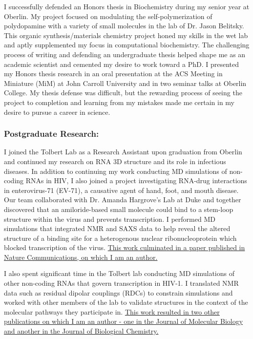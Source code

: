 \documentclass{NIHGrant}
\begin{document}
I successfully defended an Honors thesis in Biochemistry during my senior year at Oberlin. My project focused on modulating the self-polymerization of polydopamine with a variety of small molecules in the lab of Dr. Jason Belitsky. This organic synthesis/materials chemistry project honed my skills in the wet lab and aptly supplemented my focus in computational biochemistry. The challenging process of writing and defending an undergraduate thesis helped shape me as an academic scientist and cemented my desire to work toward a PhD. I presented my Honors thesis research in an oral presentation at the ACS Meeting in Miniature (MiM) at John Carroll University and in two seminar talks at Oberlin College. My thesis defense was difficult, but the rewarding process of seeing the project to completion and learning from my mistakes made me certain in my desire to pursue a career in science.

\subsubsection*{Postgraduate Research:}
I joined the Tolbert Lab as a Research Assistant upon graduation from Oberlin and continued my research on RNA 3D structure and its role in infectious diseases. In addition to continuing my work conducting MD simulations of non-coding RNAs in HIV, I also joined a project investigating RNA-drug interactions in enterovirus-71 (EV-71), a causative agent of hand, foot, and mouth disease. Our team collaborated with Dr. Amanda Hargrove's Lab at Duke and together discovered that an amiloride-based small molecule could bind to a stem-loop structure within the virus and prevents transcription. I performed MD simulations that integrated NMR and SAXS data to help reveal the altered structure of a binding site for a heterogenous nuclear ribonucleoprotein which blocked transcription of the virus. \uline{This work culminated in a paper published in Nature Communications, on which I am an author.}

I also spent significant time in the Tolbert lab conducting MD simulations of other non-coding RNAs that govern transcription in HIV-1. I translated NMR data such as residual dipolar couplings (RDCs) to constrain simulations and worked with other members of the lab to validate structures in the context of the molecular pathways they participate in. \uline{This work resulted in two other publications on which I am an author - one in the Journal of Molecular Biology and another in the Journal of Biological Chemistry.}
\end{document}
